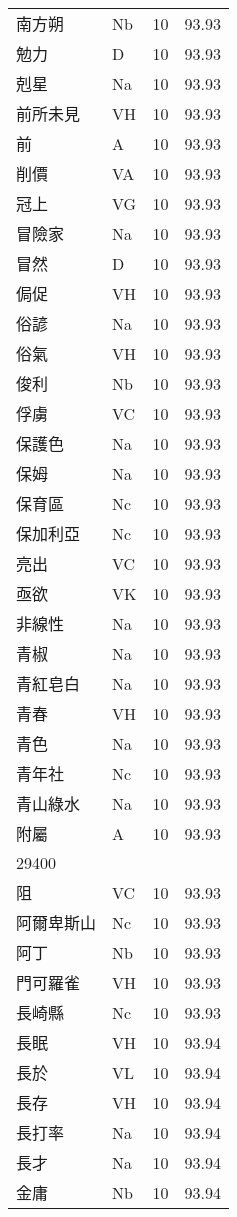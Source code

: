 \documentclass[twocolumn]{book}
\begin{document}
\begin{supertabular}{llrr}
南方朔 & Nb & 10 &  93.93\\
勉力 & D & 10 &  93.93\\
剋星 & Na & 10 &  93.93\\
前所未見 & VH & 10 &  93.93\\
前 & A & 10 &  93.93\\
削價 & VA & 10 &  93.93\\
冠上 & VG & 10 &  93.93\\
冒險家 & Na & 10 &  93.93\\
冒然 & D & 10 &  93.93\\
侷促 & VH & 10 &  93.93\\
俗諺 & Na & 10 &  93.93\\
俗氣 & VH & 10 &  93.93\\
俊利 & Nb & 10 &  93.93\\
俘虜 & VC & 10 &  93.93\\
保護色 & Na & 10 &  93.93\\
保姆 & Na & 10 &  93.93\\
保育區 & Nc & 10 &  93.93\\
保加利亞 & Nc & 10 &  93.93\\
亮出 & VC & 10 &  93.93\\
亟欲 & VK & 10 &  93.93\\
非線性 & Na & 10 &  93.93\\
青椒 & Na & 10 &  93.93\\
青紅皂白 & Na & 10 &  93.93\\
青春 & VH & 10 &  93.93\\
青色 & Na & 10 &  93.93\\
青年社 & Nc & 10 &  93.93\\
青山綠水 & Na & 10 &  93.93\\
附屬 & A & 10 &  93.93\\
29400\\
阻 & VC & 10 &  93.93\\
阿爾卑斯山 & Nc & 10 &  93.93\\
阿丁 & Nb & 10 &  93.93\\
門可羅雀 & VH & 10 &  93.93\\
長崎縣 & Nc & 10 &  93.93\\
長眠 & VH & 10 &  93.94\\
長於 & VL & 10 &  93.94\\
長存 & VH & 10 &  93.94\\
長打率 & Na & 10 &  93.94\\
長才 & Na & 10 &  93.94\\
金庸 & Nb & 10 &  93.94\\

\end{supertabular}
\end{document}
